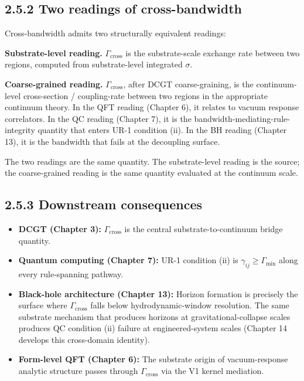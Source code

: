 \documentclass[11pt]{book}
\begin{document}
\subsection{2.5.2 Two readings of cross-bandwidth}

Cross-bandwidth admits two structurally equivalent readings:

\textbf{Substrate-level reading.} $\Gamma_\mathrm{cross}$ is the substrate-scale exchange rate between two regions, computed from substrate-level integrated $\sigma$.

\textbf{Coarse-grained reading.} $\Gamma_\mathrm{cross}$, after DCGT coarse-graining, is the continuum-level cross-section / coupling-rate between two regions in the appropriate continuum theory. In the QFT reading (Chapter 6), it relates to vacuum response correlators. In the QC reading (Chapter 7), it is the bandwidth-mediating-rule-integrity quantity that enters UR-1 condition (ii). In the BH reading (Chapter 13), it is the bandwidth that fails at the decoupling surface.

The two readings are the same quantity. The substrate-level reading is the source; the coarse-grained reading is the same quantity evaluated at the continuum scale.

\subsection{2.5.3 Downstream consequences}

\begin{itemize}
\item \textbf{DCGT (Chapter 3):} $\Gamma_\mathrm{cross}$ is the central substrate-to-continuum bridge quantity.
\item \textbf{Quantum computing (Chapter 7):} UR-1 condition (ii) is $\gamma_{ij} \geq \Gamma_\mathrm{min}$ along every rule-spanning pathway.
\item \textbf{Black-hole architecture (Chapter 13):} Horizon formation is precisely the surface where $\Gamma_\mathrm{cross}$ falls below hydrodynamic-window resolution. The same substrate mechanism that produces horizons at gravitational-collapse scales produces QC condition (ii) failure at engineered-system scales (Chapter 14 develops this cross-domain identity).
\item \textbf{Form-level QFT (Chapter 6):} The substrate origin of vacuum-response analytic structure passes through $\Gamma_\mathrm{cross}$ via the V1 kernel mediation.
\end{itemize}
\end{document}
